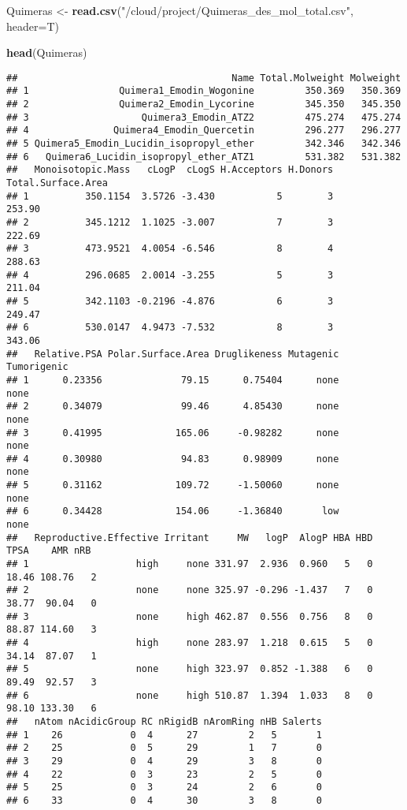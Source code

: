 \documentclass[
]{article}
\newenvironment{Shaded}{\begin{snugshade}}{\end{snugshade}}
\newcommand{\AttributeTok}[1]{\textcolor[rgb]{0.13,0.29,0.53}{#1}}
\newcommand{\FunctionTok}[1]{\textcolor[rgb]{0.13,0.29,0.53}{\textbf{#1}}}
\newcommand{\NormalTok}[1]{#1}
\newcommand{\OtherTok}[1]{\textcolor[rgb]{0.56,0.35,0.01}{#1}}
\newcommand{\StringTok}[1]{\textcolor[rgb]{0.31,0.60,0.02}{#1}}
\begin{document}
\begin{Shaded}
\begin{Highlighting}[]
\NormalTok{Quimeras }\OtherTok{\textless{}{-}} \FunctionTok{read.csv}\NormalTok{(}\StringTok{"/cloud/project/Quimeras\_des\_mol\_total.csv"}\NormalTok{, }\AttributeTok{header=}\NormalTok{T)}

\FunctionTok{head}\NormalTok{(Quimeras)}
\end{Highlighting}
\end{Shaded}

\begin{verbatim}
##                                      Name Total.Molweight Molweight
## 1                Quimera1_Emodin_Wogonine         350.369   350.369
## 2                Quimera2_Emodin_Lycorine         345.350   345.350
## 3                    Quimera3_Emodin_ATZ2         475.274   475.274
## 4               Quimera4_Emodin_Quercetin         296.277   296.277
## 5 Quimera5_Emodin_Lucidin_isopropyl_ether         342.346   342.346
## 6   Quimera6_Lucidin_isopropyl_ether_ATZ1         531.382   531.382
##   Monoisotopic.Mass   cLogP  cLogS H.Acceptors H.Donors Total.Surface.Area
## 1          350.1154  3.5726 -3.430           5        3             253.90
## 2          345.1212  1.1025 -3.007           7        3             222.69
## 3          473.9521  4.0054 -6.546           8        4             288.63
## 4          296.0685  2.0014 -3.255           5        3             211.04
## 5          342.1103 -0.2196 -4.876           6        3             249.47
## 6          530.0147  4.9473 -7.532           8        3             343.06
##   Relative.PSA Polar.Surface.Area Druglikeness Mutagenic Tumorigenic
## 1      0.23356              79.15      0.75404      none        none
## 2      0.34079              99.46      4.85430      none        none
## 3      0.41995             165.06     -0.98282      none        none
## 4      0.30980              94.83      0.98909      none        none
## 5      0.31162             109.72     -1.50060      none        none
## 6      0.34428             154.06     -1.36840       low        none
##   Reproductive.Effective Irritant     MW   logP  AlogP HBA HBD  TPSA    AMR nRB
## 1                   high     none 331.97  2.936  0.960   5   0 18.46 108.76   2
## 2                   none     none 325.97 -0.296 -1.437   7   0 38.77  90.04   0
## 3                   none     high 462.87  0.556  0.756   8   0 88.87 114.60   3
## 4                   high     none 283.97  1.218  0.615   5   0 34.14  87.07   1
## 5                   none     high 323.97  0.852 -1.388   6   0 89.49  92.57   3
## 6                   none     high 510.87  1.394  1.033   8   0 98.10 133.30   6
##   nAtom nAcidicGroup RC nRigidB nAromRing nHB Salerts
## 1    26            0  4      27         2   5       1
## 2    25            0  5      29         1   7       0
## 3    29            0  4      29         3   8       0
## 4    22            0  3      23         2   5       0
## 5    25            0  3      24         2   6       0
## 6    33            0  4      30         3   8       0
\end{verbatim}
\end{document}
